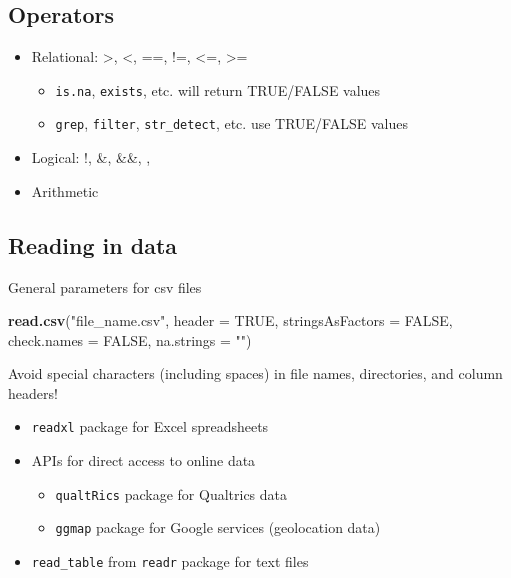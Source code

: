 \documentclass[
  openany]{book}
\newenvironment{Shaded}{\begin{snugshade}}{\end{snugshade}}
\newcommand{\DataTypeTok}[1]{\textcolor[rgb]{0.13,0.29,0.53}{#1}}
\newcommand{\KeywordTok}[1]{\textcolor[rgb]{0.13,0.29,0.53}{\textbf{#1}}}
\newcommand{\NormalTok}[1]{#1}
\newcommand{\OtherTok}[1]{\textcolor[rgb]{0.56,0.35,0.01}{#1}}
\newcommand{\StringTok}[1]{\textcolor[rgb]{0.31,0.60,0.02}{#1}}
\providecommand{\tightlist}{%
  \setlength{\itemsep}{0pt}\setlength{\parskip}{0pt}}
\begin{document}
\hypertarget{operators}{%
\subsection{Operators}\label{operators}}

\begin{itemize}
\tightlist
\item
  Relational: \textgreater, \textless, ==, !=, \textless=, \textgreater=

  \begin{itemize}
  \tightlist
  \item
    \texttt{is.na}, \texttt{exists}, etc. will return TRUE/FALSE values
  \item
    \texttt{grep}, \texttt{filter}, \texttt{str\_detect}, etc. use TRUE/FALSE values
  \end{itemize}
\item
  Logical: !, \&, \&\&, \textbar, \textbar\textbar{}
\item
  Arithmetic
\end{itemize}

\hypertarget{reading-in-data}{%
\subsection{Reading in data}\label{reading-in-data}}

General parameters for csv files

\begin{Shaded}
\begin{Highlighting}[]
\KeywordTok{read.csv}\NormalTok{(}\StringTok{"file_name.csv"}\NormalTok{, }
         \DataTypeTok{header =} \OtherTok{TRUE}\NormalTok{, }
         \DataTypeTok{stringsAsFactors =} \OtherTok{FALSE}\NormalTok{, }
         \DataTypeTok{check.names =} \OtherTok{FALSE}\NormalTok{, }
         \DataTypeTok{na.strings =} \StringTok{""}\NormalTok{)}
\end{Highlighting}
\end{Shaded}

Avoid special characters (including spaces) in file names, directories, and column headers!

\begin{itemize}
\tightlist
\item
  \texttt{readxl} package for Excel spreadsheets
\item
  APIs for direct access to online data

  \begin{itemize}
  \tightlist
  \item
    \texttt{qualtRics} package for Qualtrics data
  \item
    \texttt{ggmap} package for Google services (geolocation data)
  \end{itemize}
\item
  \texttt{read\_table} from \texttt{readr} package for text files
\end{itemize}
\end{document}
